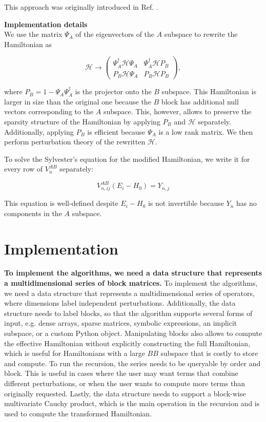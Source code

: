 \documentclass[submission, Codebases]{SciPost}
\begin{document}
{{This approach was originally introduced in Ref.
\cite{https://doi.org/10.48550/arxiv.1909.09649}.

\begin{framed}
\textbf{Implementation details}\\
We use the matrix $\Psi_A$ of the eigenvectors of the $A$ subspace to rewrite
the Hamiltonian as

\begin{equation}
\label{H_implicit}
\mathcal{H} \to \begin{pmatrix}
\Psi_A^\dagger \mathcal{H} \Psi_A & \Psi_A^\dagger \mathcal{H} P_B \\
P_B \mathcal{H} \Psi_A & P_B \mathcal{H} P_B
\end{pmatrix},
\end{equation}

where $P_B = 1 - \Psi_A \Psi_A^\dagger$ is the projector onto the $B$ subspace.
This Hamiltonian is larger in size than the original one because the $B$ block has
additional null vectors corresponding to the $A$ subspace.
This, however, allows to preserve the sparsity structure of the Hamiltonian by applying
$P_B$ and $\mathcal{H}$ separately.
Additionally, applying $P_B$ is efficient because $\Psi_A$ is a low rank matrix.
We then perform perturbation theory of the rewritten $\mathcal{H}$.

To solve the Sylvester's equation for the modified Hamiltonian, we write it for
every row of $V_n^{AB}$ separately:

\begin{equation}
V_{n, ij}^{AB} (E_i - H_0) = Y_{n, j}
\end{equation}

This equation is well-defined despite $E_i - H_0$ is not invertible because
$Y_{n}$ has no components in the $A$ subspace.
\end{framed}

\section{Implementation}

\textbf{To implement the algorithms, we need a data structure that represents a
multidimensional series of block matrices.}
To implement the algorithms, we need a data structure that represents a
multidimensional series of operators, where dimensions label independent
perturbations.
Additionally, the data structure needs to label blocks, so that the algorithm
supports several forms of input, e.g. dense arrays, sparse matrices, symbolic
expressions, an implicit subspace, or a custom Python object.
Manipulating blocks also allows to compute the effective Hamiltonian without
explicitly constructing the full Hamiltonian, which is useful for Hamiltonians
with a large $BB$ subspace that is costly to store and compute.
To run the recursion, the series needs to be queryable by order and block.
This is useful in cases where the user may want terms that combine different
perturbations, or when the user wants to compute more terms than originally
requested.
Lastly, the data structure needs to support a block-wise multivariate Cauchy
product, which is the main operation in the recursion and is used to compute
the transformed Hamiltonian.

}}
\end{document}
